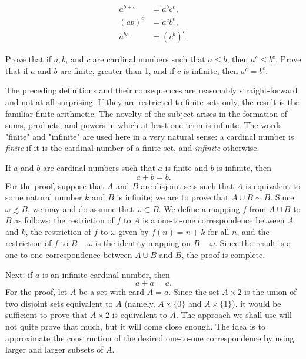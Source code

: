 \begin{align*}
a^{b+c} &= a^{b}c^{c}, \\
(ab)^{c} &= a^{c}b^{c}, \\
a^{bc} &= (c^{b})^{c}. 
\end{align*}

\begin{exercise} Prove that if $a, b$, and $c$ are cardinal numbers such that $a \le b$, then $a^{c} \le b^{c}$. Prove that if $a$ and $b$ are finite, greater than 1, and if $c$ is infinite, then $a^{c} = b^{c}$.
\end{exercise}

The preceding definitions and their consequences are reasonably straight-forward and not at all surprising. If they are restricted to finite sets only, the result is the familiar finite arithmetic. The novelty of the subject arises in the formation of sums, products, and powers in which at least one term is infinite. The words "finite" and "infinite" are used here in a very natural sense: a cardinal number is \textit{finite} if it is the cardinal number of a finite set, and \textit{infinite} otherwise. 

If $a$ and $b$ are cardinal numbers such that $a$ is finite and $b$ is infinite, then 
\begin{equation*}
a + b = b.
\end{equation*}
For the proof, suppose that $A$ and $B$ are disjoint sets such that $A$ is equivalent to some natural number $k$ and $B$ is infinite; we are to prove that $A \cup B \sim B$. Since $\omega \precsim B$, we may and do assume that $\omega \subset B$. We define a mapping $f$ from $A \cup B$ to $B$ as follows: the restriction of $f$ to $A$ is a one-to-one correspondence between $A$ and $k$, the restriction of $f$ to $\omega$ given by $f(n) = n + k$ for all $n$, and the restriction of $f$ to $B - \omega$ is the identity mapping on $B - \omega$. Since the result is a one-to-one correspondence between $A \cup B$ and $B$, the proof is complete. 

Next: if $a$ is an infinite cardinal number, then 
\begin{equation*}
a + a = a. 
\end{equation*}
For the proof, let $A$ be a set with card $A = a$. Since the set $A \times 2$ is the union of two disjoint sets equivalent to $A$ (namely, $A \times \{ 0 \}$ and $A \times \{ 1 \}$), it would be sufficient to prove that $A \times 2$ is equivalent to $A$. The approach we shall use will not quite prove that much, but it will come close enough. The idea is to approximate the construction of the desired one-to-one correspondence by using larger and larger subsets of $A$. 

